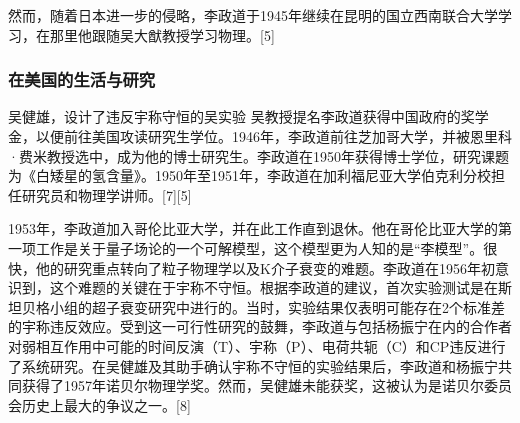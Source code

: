然而，随着日本进一步的侵略，李政道于1945年继续在昆明的国立西南联合大学学习，在那里他跟随吴大猷教授学习物理。[5]
\subsubsection{在美国的生活与研究}  
吴健雄，设计了违反宇称守恒的吴实验  
吴教授提名李政道获得中国政府的奖学金，以便前往美国攻读研究生学位。1946年，李政道前往芝加哥大学，并被恩里科·费米教授选中，成为他的博士研究生。李政道在1950年获得博士学位，研究课题为《白矮星的氢含量》。1950年至1951年，李政道在加利福尼亚大学伯克利分校担任研究员和物理学讲师。[7][5]

1953年，李政道加入哥伦比亚大学，并在此工作直到退休。他在哥伦比亚大学的第一项工作是关于量子场论的一个可解模型，这个模型更为人知的是“李模型”。很快，他的研究重点转向了粒子物理学以及K介子衰变的难题。李政道在1956年初意识到，这个难题的关键在于宇称不守恒。根据李政道的建议，首次实验测试是在斯坦贝格小组的超子衰变研究中进行的。当时，实验结果仅表明可能存在2个标准差的宇称违反效应。受到这一可行性研究的鼓舞，李政道与包括杨振宁在内的合作者对弱相互作用中可能的时间反演（T）、宇称（P）、电荷共轭（C）和CP违反进行了系统研究。在吴健雄及其助手确认宇称不守恒的实验结果后，李政道和杨振宁共同获得了1957年诺贝尔物理学奖。然而，吴健雄未能获奖，这被认为是诺贝尔委员会历史上最大的争议之一。[8]
